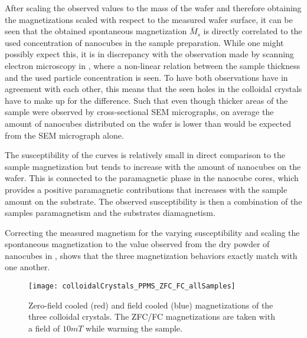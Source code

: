 \documentclass[\main/dresen_thesis.tex]{subfiles}
\begin{document}
    After scaling the observed values to the mass of the wafer and therefore obtaining the magnetizations scaled with respect to the measured wafer surface, it can be seen that the obtained spontaneous magnetization $\bar{M}_s$ is directly correlated to the used concentration of nanocubes in the sample preparation.
    While one might possibly expect this, it is in discrepancy with the observation made by scanning electron microscopy in , where a non-linear relation between the sample thickness and the used particle concentration is seen.
    To have both observations have in agreement with each other, this means that the seen holes in the colloidal crystals have to make up for the difference.
    Such that even though thicker areas of the sample were observed by cross-sectional SEM micrographs, on average the amount of nanocubes distributed on the wafer is lower than would be expected from the SEM micrograph alone.

    The susceptibility of the curves is relatively small in direct comparison to the sample magnetization but tends to increase with the amount of nanocubes on the wafer.
    This is connected to the paramagnetic phase in the nanocube cores, which provides a positive paramagnetic contributions that increases with the sample amount on the substrate.
    The observed susceptibility is then a combination of the samples paramagnetism and the substrates diamagnetism.

    Correcting the measured magnetism for the varying susceptibility and scaling the spontaneous magnetization to the value observed from the dry powder of nanocubes in ,  shows that the three magnetization behaviors exactly match with one another.


    \begin{figure}[tb]
      \centering
      \texttt{[image: colloidalCrystals\_PPMS\_ZFC\_FC\_allSamples]}
      \caption{\label{fig:colloidalCrystals:zfcFCData}Zero-field cooled (red) and field cooled (blue) magnetizations of the three colloidal crystals. The ZFC/FC magnetizations are taken with a field of $10 \unit{mT}$ while warming the sample.}
    \end{figure}
\end{document}
